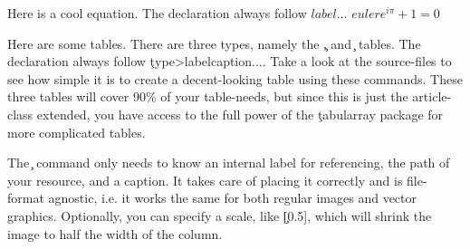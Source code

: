 \documentclass[tome,onecolumn]{lix}
\begin{document}
Here is a cool equation. The declaration always follow \c{\begin{math}{label} ... \end{math}}
\begin{math}{euler}
    e^{i\pi}+1=0
\end{math}

Here are some tables. There are three types, namely the \c{\cols, \rows} and \c{\grid} tables. The declaration always follow \c{\<type>{label}{caption}{...}}. Take a look at the source-files to see how simple it is to create a decent-looking table using these commands. These three tables will cover 90\% of your table-needs, but since this is just the article-class extended, you have access to the full power of the \c{tabularray}\cite{tabularray} package for more complicated tables.




The \c{} command only needs to know an internal label for referencing, the path of your resource, and a caption. It takes care of placing it correctly and is file-format agnostic, i.e. it works the same for both regular images and vector graphics. Optionally, you can specify a scale, like \c{[0.5]}, which will shrink the image to half the width of the column.

\end{document}
